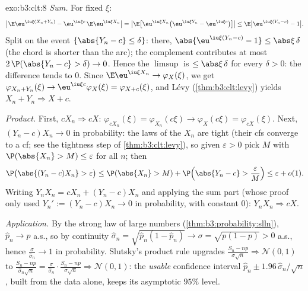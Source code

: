 \begin{solution}{exo:b3:clt:8}
\emph{Sum.} For fixed $\xi$:
\[
\bigl|\E\eu^{\iu\xi(X_n+Y_n)} -
\eu^{\iu\xi c}\,\E\eu^{\iu\xi X_n}\bigr|
= \bigl|\E\bigl[\eu^{\iu\xi X_n}\bigl(\eu^{\iu\xi Y_n} -
\eu^{\iu\xi c}\bigr)\bigr]\bigr|
\leq \E\bigl|\eu^{\iu\xi(Y_n - c)} - 1\bigr| .
\]
Split on the event $\{\abs{Y_n - c} \leq \delta\}$: there,
$\abs{\eu^{\iu\xi(Y_n-c)} - 1} \leq \abs\xi\,\delta$ (the
chord is shorter than the arc); the complement contributes
at most $2\,\P(\abs{Y_n - c} > \delta) \to 0$. Hence the
$\limsup$ is $\leq \abs\xi\,\delta$ for every $\delta > 0$:
the difference tends to $0$. Since $\E\eu^{\iu\xi X_n} \to
\varphi_X(\xi)$, we get $\varphi_{X_n+Y_n}(\xi) \to
\eu^{\iu\xi c}\varphi_X(\xi) = \varphi_{X+c}(\xi)$, and
L\'evy (\cref{thm:b3:clt:levy}) yields $X_n + Y_n
\Rightarrow X + c$.

\emph{Product.} First, $cX_n \Rightarrow cX$:
$\varphi_{cX_n}(\xi) = \varphi_{X_n}(c\xi) \to
\varphi_X(c\xi) = \varphi_{cX}(\xi)$. Next, $(Y_n - c)X_n
\to 0$ in probability: the laws of the $X_n$ are tight (their
cfs converge to a cf; see the tightness step of
\cref{thm:b3:clt:levy}), so given $\varepsilon > 0$ pick $M$
with $\P(\abs{X_n} > M) \leq \varepsilon$ for all $n$; then
\[
\P\bigl(\abs{(Y_n - c)X_n} > \varepsilon\bigr) \leq
\P(\abs{X_n} > M) + \P\Bigl(\abs{Y_n - c} >
\frac{\varepsilon}{M}\Bigr) \leq \varepsilon + o(1) .
\]
Writing $Y_nX_n = cX_n + (Y_n - c)X_n$ and applying the sum
part (whose proof only used $Y_n' := (Y_n - c)X_n \to 0$ in
probability, with constant $0$): $Y_nX_n \Rightarrow cX$.

\emph{Application.} By the strong law of large numbers
(\cref{thm:b3:probability:slln}), $\hat p_n \to p$ a.s., so
by continuity $\hat\sigma_n = \sqrt{\hat p_n(1 - \hat p_n)}
\to \sigma = \sqrt{p(1 - p)} > 0$ a.s., hence
$\frac{\sigma}{\hat\sigma_n} \to 1$ in probability. Slutsky's
product rule upgrades $\frac{S_n - np}{\sigma\sqrt n}
\Rightarrow \mathcal N(0,1)$ to $\frac{S_n -
np}{\hat\sigma_n\sqrt n} = \frac{\sigma}{\hat\sigma_n}\cdot
\frac{S_n - np}{\sigma\sqrt n} \Rightarrow \mathcal N(0,1)$:
the \emph{usable} confidence interval $\hat p_n \pm
1.96\,\hat\sigma_n/\sqrt n$, built from the data alone,
keeps its asymptotic $95\%$ level.
\end{solution}

